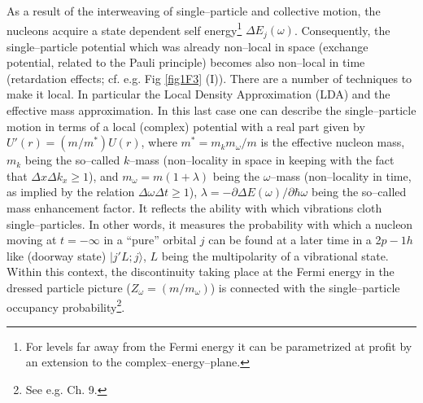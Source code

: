 As a result of the interweaving of single--particle and collective motion, the nucleons acquire a state dependent self energy\footnote{For levels far away from the Fermi energy it can be parametrized at profit by an extension to the complex--energy--plane.} $\Delta E_j(\omega)$.   Consequently, the single--particle potential which was already non--local in space (exchange potential, related to the Pauli principle) becomes also non--local in time (retardation effects; cf. e.g. Fig \ref{fig1F3} (I)). There are a number of techniques to make it local. In particular the Local Density Approximation (LDA) and the effective mass approximation. In this last case one can describe the single--particle motion in terms of a local (complex) potential with a real part given by $U'(r)=(m/m^*)U(r)$, where $m^*=m_km_\omega/m$ is the effective nucleon mass, $m_k$ being the so--called $k$--mass (non--locality in space in keeping with the fact that $\Delta x\Delta k_x\geq1$), and $m_\omega=m(1+\lambda)$ being the $\omega$--mass (non--locality in time, as implied by the relation $\Delta \omega\Delta t\geq1$),  $\lambda=-\partial \Delta E(\omega)/\partial \hbar \omega$ being the so--called mass enhancement factor. It reflects the ability with which vibrations cloth single--particles. In other words, it measures the probability with which a nucleon moving at  $t=-\infty$ in a ``pure'' orbital $j$ can be found at a later time in a 2$p-1h$ like (doorway state) $|j'L;j\rangle$, $L$ being the multipolarity of a vibrational state. Within this context, the discontinuity taking place at the Fermi energy in the dressed particle picture ($Z_\omega=(m/m_\omega)$) is connected with the single--particle occupancy probability\footnote{See e.g. \cite{Brink:05} Ch. 9.}.


